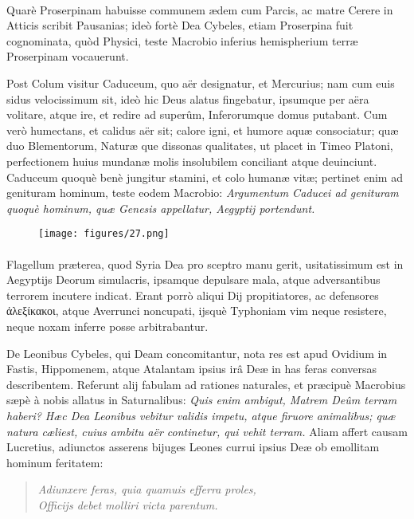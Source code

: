 \documentclass[a4paper, 11pt, oneside, polutonikogreek, latin]{article}
\begin{document}
\paragraph{}
Quarè Proserpinam habuisse communem ædem cum Parcis, ac matre Cerere in Atticis scribit Pausanias; ideò fortè Dea Cybeles, etiam Proserpina fuit cognominata, quòd Physici, teste Macrobio inferius hemispherium terræ Proserpinam vocauerunt.

Post Colum visitur Caduceum, quo aër designatur, et Mercurius; nam cum euis sidus velocissimum sit, ideò hic Deus alatus fingebatur, ipsumque per aëra volitare, atque ire, et redire ad superûm, Inferorumque domus putabant. Cum verò humectans, et calidus aër sit; calore igni, et humore aquæ consociatur; quæ duo Blementorum, Naturæ que dissonas qualitates, ut placet in Timeo Platoni, perfectionem huius mundanæ molis insolubilem conciliant atque deuinciunt. Caduceum quoquè benè jungitur stamini, et colo humanæ vitæ; pertinet enim ad genituram hominum, teste eodem Macrobio: \emph{Argumentum Caducei ad genituram quoquè hominum, quæ Genesis appellatur, Aegyptij portendunt.}
\clearpage
\vspace*{\fill}
\begin{figure}[H]
\centering
\texttt{[image: figures/27.png]}
\end{figure}
\vspace*{\fill}
\clearpage
\paragraph{}
Flagellum præterea, quod Syria Dea pro sceptro manu gerit, usitatissimum est in Aegyptijs Deorum simulacris, ipsamque depulsare mala, atque adversantibus terrorem incutere indicat. Erant porrò aliqui Dij propitiatores, ac defensores ἀλεξίκακοι, atque Averrunci noncupati, ijsquè Typhoniam vim neque resistere, neque noxam inferre posse arbitrabantur.

De Leonibus Cybeles, qui Deam concomitantur, nota res est apud Ovidium in Fastis, Hippomenem, atque Atalantam ipsius irâ Deæ in has feras conversas describentem. Referunt alij fabulam ad rationes naturales, et præcipuè Macrobius sæpè à nobis allatus in Saturnalibus: \emph{Quis enim ambigut, Matrem Deûm terram haberi? Hæc Dea Leonibus vebitur validis impetu, atque firuore animalibus; quæ natura cæliest, cuius ambitu aër continetur, qui vehit terram.} Aliam affert causam Lucretius, adiunctos asserens bijuges Leones currui ipsius Deæ ob emollitam hominum feritatem:
\begin{quote}
\emph{Adiunxere feras, quia quamuis efferra proles,}\\
\emph{Officijs debet molliri victa parentum.}\\
\end{quote}
\end{document}
